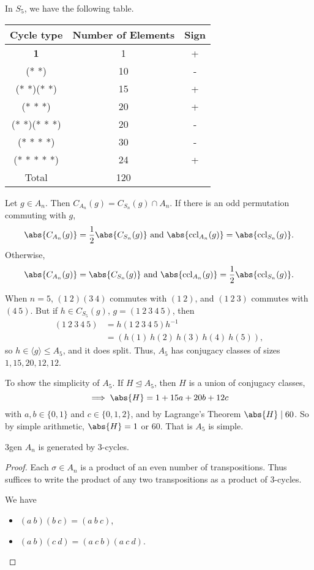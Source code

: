 \begin{example}
    In \(S_5\), we have the following table.
    \begin{center}
    \begin{tabular}{c|c|c}
        Cycle type & Number of Elements & Sign\\
        \hline
        \textbf{1}& 1 & +\\
        (* *)& 10& -\\
        (* *)(* *)& 15 & +\\
        (* {*} *)& 20 & +\\
        (* *)(* {*} *)& 20& -\\
        (* {*} {*} *)&30&-\\
        (* {*} {*} {*} *)&24&+\\
        \hline
        Total&120&
    \end{tabular}
\end{center}
\end{example}
Let \(g \in A_n\). Then \(C_{A_n}(g) = C_{S_n}(g)\cap A_n\). If there is an odd permutation commuting with \(g\),
\[
    \abs{C_{A_n}(g)} = \frac{1}{2}\abs{C_{S_n}(g)} \text{ and } \abs{\mathrm{ccl}_{A_n}(g)} = \abs{\mathrm{ccl}_{S_n}(g)} .
\]
Otherwise,
\[
    \abs{C_{A_n}(g)} = \abs{C_{S_n}(g)} \text{ and } \abs{\mathrm{ccl}_{A_n}(g)} = \frac{1}{2}\abs{\mathrm{ccl}_{S_n}(g)} .
\]
\begin{example}
    When \(n = 5\), \((1~2)(3~4)\) commutes with \((1~2)\), and \((1~2~3)\) commutes with \((4~5)\). But if \(h \in C_{S_5}(g)\), \(g=(1~2~3~4~5)\), then
    \begin{align*}
        (1~2~3~4~5) &= h (1~2~3~4~5) h^{-1}\\
        &=(h(1)~h(2)~h(3)~h(4)~h(5)),
    \end{align*}
    so \(h \in \langle g\rangle\leq A_5\), and it does split. Thus, \(A_5\) has conjugacy classes of sizes \(1,15,20,12,12\).
    
    To show the simplicity of \(A_5\). If \(H \trianglelefteq A_5\), then \(H\) is a union of conjugacy classes,
    \[
        \implies \abs{H} = 1 + 15a + 20b + 12c
    \]
    with \(a,b \in \{0,1\}\) and \(c \in \{0,1,2\}\), and by Lagrange's Theorem \(\abs{H} \mid 60\). So by simple arithmetic, \(\abs{H} = 1\) or \(60\). That is \(A_5\) is simple.
\end{example}
\begin{lemma}{}{3gen}
    \(A_n\) is generated by 3-cycles.
\end{lemma}
\begin{proof}
    Each \(\sigma \in A_n\) is a product of an even number of transpositions. Thus suffices to write the product of any two transpositions as a product of 3-cycles.
    
    We have
    \begin{itemize}
        \item \((a~b)(b~c) = (a~b~c)\),
        \item \((a~b)(c~d) = (a~c~b)(a~c~d)\).
    \end{itemize}
\end{proof}
